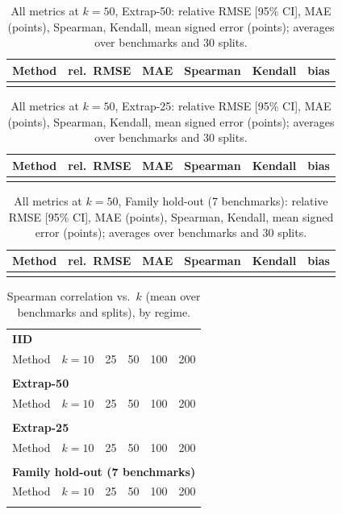 \begin{table}[h]
\caption{All metrics at $k=50$, Extrap-50: relative RMSE [95\% CI], MAE (points), Spearman, Kendall, mean signed error (points); averages over benchmarks and 30 splits.}
\label{tab:full_up50}
\centering\footnotesize
\begin{tabular}{lccccc}
\toprule
Method & rel.\ RMSE & MAE & Spearman & Kendall & bias\\
\midrule
\\
\bottomrule
\end{tabular}
\end{table}
\begin{table}[h]
\caption{All metrics at $k=50$, Extrap-25: relative RMSE [95\% CI], MAE (points), Spearman, Kendall, mean signed error (points); averages over benchmarks and 30 splits.}
\label{tab:full_up75}
\centering\footnotesize
\begin{tabular}{lccccc}
\toprule
Method & rel.\ RMSE & MAE & Spearman & Kendall & bias\\
\midrule
\\
\bottomrule
\end{tabular}
\end{table}
\begin{table}[h]
\caption{All metrics at $k=50$, Family hold-out (7 benchmarks): relative RMSE [95\% CI], MAE (points), Spearman, Kendall, mean signed error (points); averages over benchmarks and 30 splits.}
\label{tab:full_fam}
\centering\footnotesize
\begin{tabular}{lccccc}
\toprule
Method & rel.\ RMSE & MAE & Spearman & Kendall & bias\\
\midrule
\\
\bottomrule
\end{tabular}
\end{table}
\begin{table}[h]
\caption{Spearman correlation vs.\ $k$ (mean over benchmarks and splits), by regime.}
\label{tab:spk}
\centering\scriptsize
\begin{tabular}{lccccc}
\toprule
\multicolumn{6}{l}{\textbf{IID}}\\
Method & $k{=}10$ & 25 & 50 & 100 & 200\\
\midrule
\\
\midrule
\multicolumn{6}{l}{\textbf{Extrap-50}}\\
Method & $k{=}10$ & 25 & 50 & 100 & 200\\
\midrule
\\
\midrule
\multicolumn{6}{l}{\textbf{Extrap-25}}\\
Method & $k{=}10$ & 25 & 50 & 100 & 200\\
\midrule
\\
\midrule
\multicolumn{6}{l}{\textbf{Family hold-out (7 benchmarks)}}\\
Method & $k{=}10$ & 25 & 50 & 100 & 200\\
\midrule
\\
\bottomrule
\end{tabular}
\end{table}

